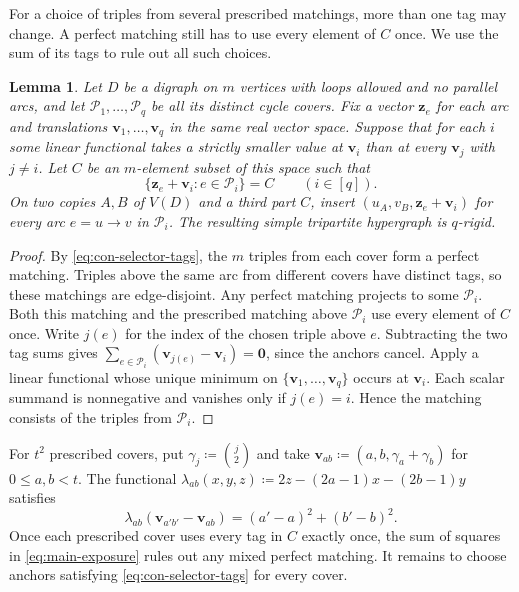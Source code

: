 \documentclass[10pt]{article}
\numberwithin{equation}{section}
\newtheorem{lemma}[lemma]{Lemma}
\theoremstyle{definition}
\begin{document}
For a choice of triples from several prescribed matchings, more than one tag may change. A perfect matching still has to use every element of $C$ once. We use the sum of its tags to rule out all such choices.

\begin{samepage}
\begin{lemma}\label{lem:exposed-translations}
Let $D$ be a digraph on $m$ vertices with loops allowed and no parallel arcs, and let $\mathcal P_1,\ldots,\mathcal P_q$ be all its distinct cycle covers. Fix a vector $\mathbf z_e$ for each arc and translations $\mathbf v_1,\ldots,\mathbf v_q$ in the same real vector space. Suppose that for each $i$ some linear functional takes a strictly smaller value at $\mathbf v_i$ than at every $\mathbf v_j$ with $j\ne i$. Let $C$ be an $m$-element subset of this space such that
\begin{equation}
 \{\mathbf z_e+\mathbf v_i\colon e\in\mathcal P_i\}=C\qquad(i\in[q]).
 \label{eq:con-selector-tags}
\end{equation}
On two copies $A,B$ of $V(D)$ and a third part $C$, insert $(u_A,v_B,\mathbf z_e+\mathbf v_i)$ for every arc $e=u\to v$ in $\mathcal P_i$. The resulting simple tripartite hypergraph is $q$-rigid.
\end{lemma}
\end{samepage}
\begin{proof}
By \cref{eq:con-selector-tags}, the $m$ triples from each cover form a perfect matching. Triples above the same arc from different covers have distinct tags, so these matchings are edge-disjoint. Any perfect matching projects to some $\mathcal P_i$. Both this matching and the prescribed matching above $\mathcal P_i$ use every element of $C$ once. Write $j(e)$ for the index of the chosen triple above $e$. Subtracting the two tag sums gives $\sum_{e\in\mathcal P_i}(\mathbf v_{j(e)}-\mathbf v_i)=\mathbf0$, since the anchors cancel. Apply a linear functional whose unique minimum on $\{\mathbf v_1,\ldots,\mathbf v_q\}$ occurs at $\mathbf v_i$. Each scalar summand is nonnegative and vanishes only if $j(e)=i$. Hence the matching consists of the triples from $\mathcal P_i$.
\end{proof}

For $t^2$ prescribed covers, put $\gamma_j\coloneqq\binom j2$ and take $\mathbf v_{ab}\coloneqq(a,b,\gamma_a+\gamma_b)$ for $0\le a,b<t$. The functional $\lambda_{ab}(x,y,z)\coloneqq2z-(2a-1)x-(2b-1)y$ satisfies
\begin{equation}
 \lambda_{ab}(\mathbf v_{a'b'}-\mathbf v_{ab})
 =(a'-a)^2+(b'-b)^2.
 \label{eq:main-exposure}
\end{equation}
Once each prescribed cover uses every tag in $C$ exactly once, the sum of squares in \cref{eq:main-exposure} rules out any mixed perfect matching. It remains to choose anchors satisfying \cref{eq:con-selector-tags} for every cover.
\end{document}
